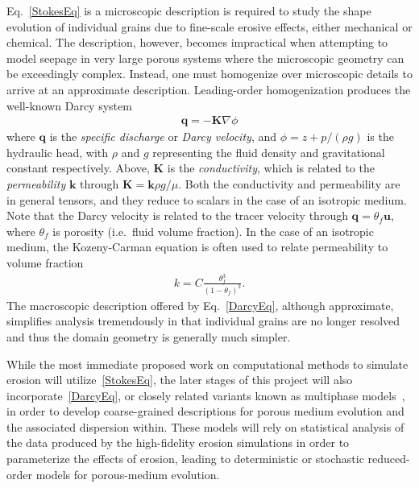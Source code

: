 \documentclass[11pt]{article}
\newcommand{\bvec}[1]{{\mathbf{#1}}}
\newcommand{\grad}{\nabla}
\newcommand{\uu}{\bvec{u}}
\newcommand {\qq} {\bvec{q}}
\begin{document}
Eq.~\eqref{StokesEq} is a microscopic description is required to study the shape evolution of individual grains due to fine-scale erosive effects, either mechanical or chemical. The description, however, becomes impractical when attempting to model seepage in very large porous systems where the microscopic geometry can be exceedingly complex. Instead, one must homogenize over microscopic details to arrive at an approximate description. Leading-order homogenization produces the well-known Darcy system 
\begin{align}
  \label{DarcyEq}
  \qq = - \bvec{K} \grad \phi
\end{align}
where $\qq$ is the {\em specific discharge} or {\em Darcy velocity}, and $\phi = z + p/(\rho g)$ is the hydraulic head, with $\rho$ and $g$ representing the fluid density and gravitational constant respectively.  Above, $\bvec{K}$ is the {\em conductivity}, which is related to the {\em permeability} $\bvec{k}$ through $\bvec{K} = \bvec{k} \rho g/\mu$.  Both the conductivity and permeability are in general tensors, and they reduce to scalars in the case of an isotropic medium. Note that the Darcy velocity is related to the tracer velocity through $\qq = \theta_f \uu$, where $\theta_f$ is porosity (i.e.~fluid volume fraction).  In the case of an isotropic medium, the Kozeny-Carman equation is often used to relate permeability to volume fraction~\cite{bear2013dynamics}
\begin{align}
  k = C \frac{\theta_f^3}{(1-\theta_f)^2}.
\end{align}
The macroscopic description offered by Eq.~\eqref{DarcyEq}, although approximate, simplifies analysis tremendously in that individual grains are no longer resolved and thus the domain geometry is generally much simpler.

While the most immediate proposed work on computational methods to simulate erosion will utilize~\eqref{StokesEq}, the later stages of this project will also incorporate~\eqref{DarcyEq}, or closely related variants known as multiphase models~\cite{Imma2019, eastham2019multiphase}, in order to develop coarse-grained descriptions for porous medium evolution and the associated dispersion within. These models will rely on statistical analysis of the data produced by the high-fidelity erosion simulations in order to parameterize the effects of erosion, leading to deterministic or stochastic reduced-order models for porous-medium evolution. 
\end{document}
